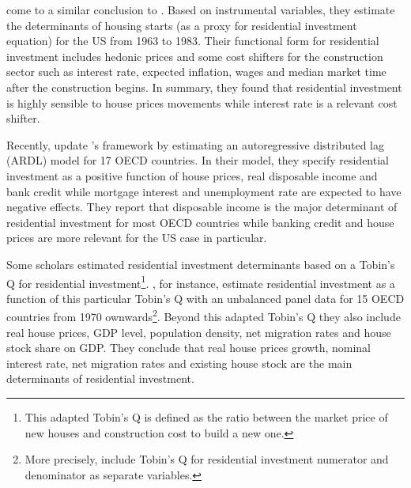\documentclass[12pt, a4paper]{article}
\begin{document}
\textcite{topel_1988_Housing} come to a similar conclusion to \textcite{poterba_tax_1984}.
Based on instrumental variables, they estimate the determinants of housing starts (as a proxy for residential investment equation) for the US from 1963 to 1983.
Their functional form for residential investment includes hedonic prices and some cost shifters for the construction sector such as interest rate, expected inflation, wages and median market time after the construction begins.
In summary, they found that residential investment is highly sensible to house prices movements while interest rate is a relevant cost shifter.

Recently,  \textcite{arestis_residential_2015} update \citeauthor*{poterba_tax_1984}'s \citeyear{poterba_tax_1984} framework by estimating an autoregressive distributed lag (ARDL) model for 17 OECD countries.
In their model, they specify residential investment as a positive function of house prices, real disposable income and bank credit while mortgage interest and unemployment rate are expected to have negative effects.
They report that disposable income is the major determinant of residential investment for most OECD countries while banking credit and house prices are more relevant for the US case in particular.

Some scholars estimated residential investment determinants based on a Tobin's Q for residential investment\footnote{This adapted Tobin's Q is defined as the ratio between the market price of new houses and construction cost to build a new one.}.
\textcite{kohlscheen_2018_Residential}, for instance, estimate residential investment as a function of this particular Tobin's Q with an unbalanced panel data for 15 OECD countries from 1970 ownwards\footnote{More precisely, \textcite{kohlscheen_2018_Residential} include Tobin's Q for residential investment numerator and denominator as separate variables.}.
Beyond this adapted Tobin's Q they also include real house prices, GDP level, population density, net migration rates and house stock share on GDP.
They conclude that real house prices growth, nominal interest rate, net migration rates and existing house stock are the main determinants of residential investment.
\end{document}
